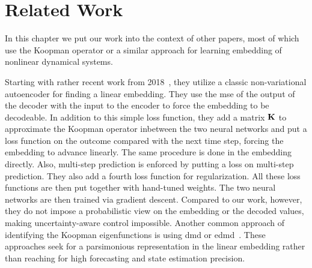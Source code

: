 \chapter{Related Work}
\label{c:relatedWork}



In this chapter we put our work into the context of other papers, most of which use the Koopman operator or a similar approach for learning embedding of nonlinear dynamical systems.

Starting with rather recent work from 2018~\cite{luschDeepLearningUniversal2018}, they utilize a classic non-variational autoencoder for finding a linear embedding. They use the \ac{mse} of the output of the decoder with the input to the encoder to force the embedding to be decodeable. In addition to this simple loss function, they add a matrix \(\boldsymbol{\mathrm{K}}\) to approximate the Koopman operator inbetween the two neural networks and put a loss function on the outcome compared with the next time step, forcing the embedding to advance linearly. The same procedure is done in the embedding directly. Also, multi-step prediction is enforced by putting a loss on multi-step prediction. They also add a fourth loss function for regularization. All these loss functions are then put together with hand-tuned weights. The two neural networks are then trained via gradient descent. Compared to our work, however, they do not impose a probabilistic view on the embedding or the decoded values, making uncertainty-aware control impossible. Another common approach of identifying the Koopman eigenfunctions is using \ac{dmd} or \ac{edmd}~\cite{bruntonKoopmanInvariantSubspaces2016,kaiserDatadrivenDiscoveryKoopman2020,williamsDataDrivenApproximation2015}. These approaches seek for a parsimonious representation in the linear embedding rather than reaching for high forecasting and state estimation precision.

